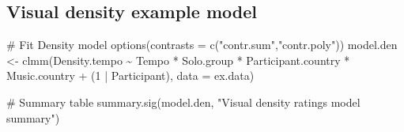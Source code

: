 \documentclass[
  bookmarksnumbered]{article}
\newenvironment{Shaded}{\begin{snugshade}}{\end{snugshade}}
\newcommand{\AttributeTok}[1]{\textcolor[rgb]{0.80,0.80,0.80}{#1}}
\newcommand{\CommentTok}[1]{\textcolor[rgb]{0.50,0.62,0.50}{#1}}
\newcommand{\DecValTok}[1]{\textcolor[rgb]{0.86,0.86,0.80}{#1}}
\newcommand{\FunctionTok}[1]{\textcolor[rgb]{0.94,0.94,0.56}{#1}}
\newcommand{\NormalTok}[1]{\textcolor[rgb]{0.80,0.80,0.80}{#1}}
\newcommand{\OtherTok}[1]{\textcolor[rgb]{0.94,0.94,0.56}{#1}}
\newcommand{\SpecialCharTok}[1]{\textcolor[rgb]{0.86,0.64,0.64}{#1}}
\newcommand{\StringTok}[1]{\textcolor[rgb]{0.80,0.58,0.58}{#1}}
\begin{document}
\hypertarget{visual-density-example-model}{%
\subsection{Visual density example model}\label{visual-density-example-model}}

\begin{Shaded}
\begin{Highlighting}[]
\CommentTok{\# Fit Density model}
\FunctionTok{options}\NormalTok{(}\AttributeTok{contrasts =} \FunctionTok{c}\NormalTok{(}\StringTok{"contr.sum"}\NormalTok{,}\StringTok{"contr.poly"}\NormalTok{))}
\NormalTok{model.den }\OtherTok{\textless{}{-}} \FunctionTok{clmm}\NormalTok{(Density.tempo }\SpecialCharTok{\textasciitilde{}}\NormalTok{ Tempo }\SpecialCharTok{*}\NormalTok{ Solo.group }\SpecialCharTok{*}\NormalTok{ Participant.country }\SpecialCharTok{*}\NormalTok{ Music.country }\SpecialCharTok{+} 
\NormalTok{                    (}\DecValTok{1} \SpecialCharTok{|}\NormalTok{ Participant),}
                  \AttributeTok{data =}\NormalTok{ ex.data)}

\CommentTok{\# Summary table}
\FunctionTok{summary.sig}\NormalTok{(model.den, }\StringTok{"Visual density ratings model summary"}\NormalTok{)}
\end{Highlighting}
\end{Shaded}
\end{document}
